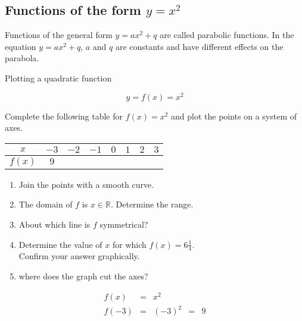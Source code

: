 \subsection*{Functions of the form $y={x}^{2}$}       
Functions of the general form $y=a{x}^{2}+q$ are called parabolic functions. In the equation $y=a{x}^{2}+q$, $a$ and $q$ are constants and have different effects on the parabola. 
\par
{}
\clearpage
\begin{wex}{Plotting a quadratic function}
{
\begin{equation*}
 y = f(x) = x^{2}
\end{equation*}

Complete the following table for $f(x)=x^{2}$ and plot the points on a system of axes.
\\
\begin{center}
\begin{tabular}{|c|c|c|c|c|c|c|c|}
\hline
  $x$ &  $-3$ & $-2$ & $-1$ & $0$ & $1$ & $2$ & $3$
\\ \hline
 $f(x)$& $9$ & \hspace{1cm} & \hspace{1cm} & \hspace{1cm} & \hspace{1cm} & \hspace{1cm} & \hspace{1cm} 
\\ \hline
\end{tabular}
\end{center}
\vspace{10pt}
\begin{enumerate}[noitemsep, label=\textbf{\arabic*}. ] 
 \item Join the points with a smooth curve.
\item The domain of $f$ is $x \in \mathbb{R}$. Determine the range.
\item About which line is $f$ symmetrical?
\item Determine the value of $x$ for which $f(x) = 6\frac{1}{4}$. \\Confirm your answer graphically.
\item  where does the graph cut the axes?
\end{enumerate}
}
{
\begin{equation*}
 \begin{array}{cclcc}
  f(x) &=& x^{2} & &\\
 f(-3) &=& (-3)^{2} &=& 9 \\ 

\end{array}
\end{equation*}}
\end{wex}
